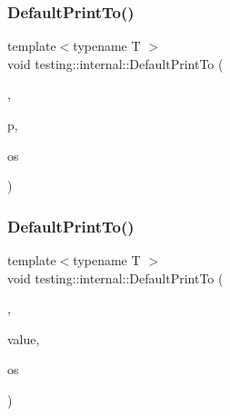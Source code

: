 \mbox{\label{namespacetesting_1_1internal_a7729c07abcae6c69b9b370c39db61409}} 
\subsubsection{\texorpdfstring{DefaultPrintTo()}{DefaultPrintTo()}\hspace{0.1cm}{\footnotesize\ttfamily [3/4]}}
{\footnotesize\ttfamily template$<$typename T $>$ \\
void testing\+::internal\+::\+Default\+Print\+To (\begin{DoxyParamCaption}\item[{\mbox{\hyperlink{structtesting_1_1internal_1_1_wrap_printer_type}{Wrap\+Printer\+Type}}$<$ \mbox{\hyperlink{namespacetesting_1_1internal_a17fb8f0125fa92404a249ed38a43faa4a551a415d6ab7bf71fec628217495ed77}{k\+Print\+Function\+Pointer}} $>$}]{,  }\item[{T $\ast$}]{p,  }\item[{\+::std\+::ostream $\ast$}]{os }\end{DoxyParamCaption})}

\mbox{\label{namespacetesting_1_1internal_a72b1a69d96be8ea6382539f5c4fcac6d}} 
\subsubsection{\texorpdfstring{DefaultPrintTo()}{DefaultPrintTo()}\hspace{0.1cm}{\footnotesize\ttfamily [4/4]}}
{\footnotesize\ttfamily template$<$typename T $>$ \\
void testing\+::internal\+::\+Default\+Print\+To (\begin{DoxyParamCaption}\item[{\mbox{\hyperlink{structtesting_1_1internal_1_1_wrap_printer_type}{Wrap\+Printer\+Type}}$<$ \mbox{\hyperlink{namespacetesting_1_1internal_a17fb8f0125fa92404a249ed38a43faa4a8375ffd8fcecbcf4fafb4b94e804aa57}{k\+Print\+Other}} $>$}]{,  }\item[{const T \&}]{value,  }\item[{\+::std\+::ostream $\ast$}]{os }\end{DoxyParamCaption})}

